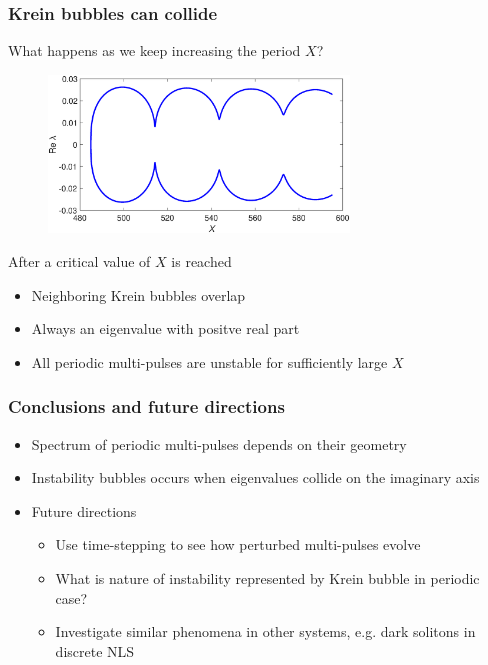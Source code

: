\documentclass[16pt]{beamer}
\begin{document}
\begin{frame}
	\frametitle{Krein bubbles can collide}
	What happens as we keep increasing the period $X$?
		\begin{figure}
		\begin{center}
		\includegraphics[width=8cm]{images/KreinBubbleCollision.eps}
		\end{center}
		\end{figure}
	After a critical value of $X$ is reached
	\begin{itemize}
		\item Neighboring Krein bubbles overlap
		\item Always an eigenvalue with positve real part
		\item All periodic multi-pulses are unstable for sufficiently large $X$
	\end{itemize}
\end{frame}

\begin{frame}
	\frametitle{Conclusions and future directions}
	\fontsize{14}{7.2}\selectfont
	\begin{itemize}
		\item Spectrum of periodic multi-pulses depends on their geometry
		\vspace{0.5cm}
		\item Instability bubbles occurs when eigenvalues collide on the imaginary axis
		\vspace{0.5cm}
		\item Future directions
		\begin{itemize}
		\item Use time-stepping to see how perturbed multi-pulses evolve
		\item What is nature of instability represented by Krein bubble in periodic case?
		\item Investigate similar phenomena in other systems, e.g. dark solitons in discrete NLS
		\end{itemize}
	\end{itemize}
\end{frame}
\end{document}
